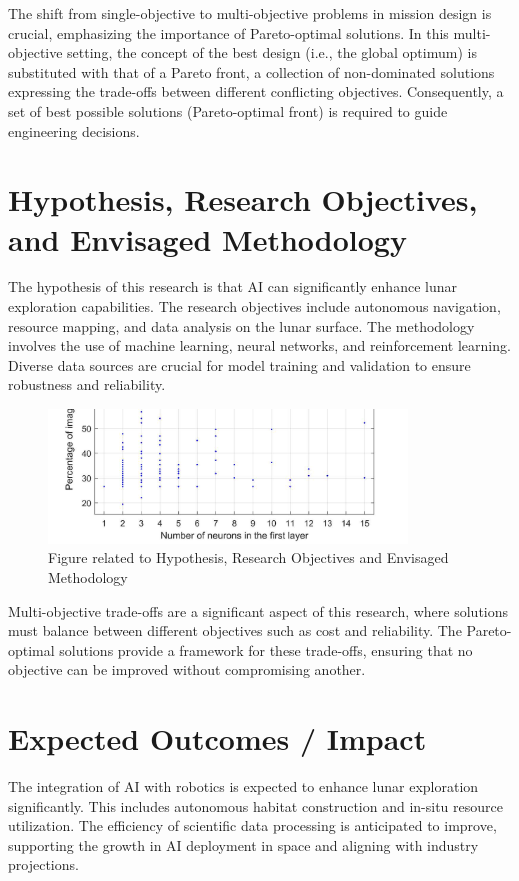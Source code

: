 \documentclass[12pt]{article}
\begin{document}
The shift from single-objective to multi-objective problems in mission design is crucial, emphasizing the importance of Pareto-optimal solutions. In this multi-objective setting, the concept of the best design (i.e., the global optimum) is substituted with that of a Pareto front, a collection of non-dominated solutions expressing the trade-offs between different conflicting objectives. Consequently, a set of best possible solutions (Pareto-optimal front) is required to guide engineering decisions.

\section{Hypothesis, Research Objectives, and Envisaged Methodology}
The hypothesis of this research is that AI can significantly enhance lunar exploration capabilities. The research objectives include autonomous navigation, resource mapping, and data analysis on the lunar surface. The methodology involves the use of machine learning, neural networks, and reinforcement learning. Diverse data sources are crucial for model training and validation to ensure robustness and reliability.

\begin{figure}[htbp]
    \centering
    \includegraphics[width=0.85\textwidth]{images/hypothesis,_research_objectives_and_envisaged_methodology_img_1.png}
    \caption{Figure related to Hypothesis, Research Objectives and Envisaged Methodology}
    \label{fig:hypothesis,_research_objectives_and_envisaged_methodology_1}
\end{figure}

Multi-objective trade-offs are a significant aspect of this research, where solutions must balance between different objectives such as cost and reliability. The Pareto-optimal solutions provide a framework for these trade-offs, ensuring that no objective can be improved without compromising another.

\section{Expected Outcomes / Impact}
The integration of AI with robotics is expected to enhance lunar exploration significantly. This includes autonomous habitat construction and in-situ resource utilization. The efficiency of scientific data processing is anticipated to improve, supporting the growth in AI deployment in space and aligning with industry projections.
\end{document}
